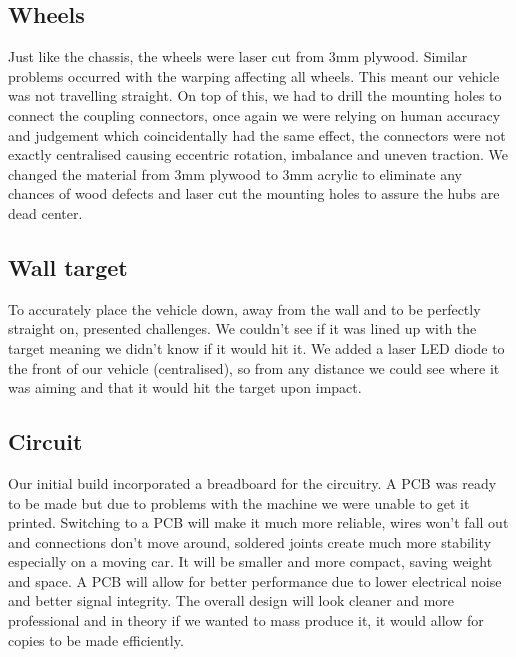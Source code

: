 \documentclass{article}
\begin{document}
\subsection{Wheels}
Just like the chassis, the wheels were laser cut from 3mm plywood. Similar problems occurred with the warping affecting all wheels. This meant our vehicle was not travelling straight. On top of this, we had to drill the mounting holes to connect the coupling connectors, once again we were relying on human accuracy and judgement which coincidentally had the same effect, the connectors were not exactly centralised causing eccentric rotation, imbalance and uneven traction. We changed the material from 3mm plywood to 3mm acrylic to eliminate any chances of wood defects and laser cut the mounting holes to assure the hubs are dead center.  
\subsection{Wall target}
To accurately place the vehicle down, away from the wall and to be perfectly straight on, presented challenges. We couldn't see if it was lined up with the target meaning we didn't know if it would hit it. We added a laser LED diode to the front of our vehicle (centralised), so from any distance we could see where it was aiming and that it would hit the target upon impact.
\subsection{Circuit}
Our initial build incorporated a breadboard for the circuitry. A PCB was ready to be made but due to problems with the machine we were unable to get it printed. Switching to a PCB will make it much more reliable, wires won't fall out and connections don't move around, soldered joints create much more stability especially on a moving car. It will be smaller and more compact, saving weight and space. A PCB will allow for better performance due to lower electrical noise and better signal integrity. The overall design will look cleaner and more professional and in theory if we wanted to mass produce it, it would allow for copies to be made efficiently.  



\newpage
\end{document}
